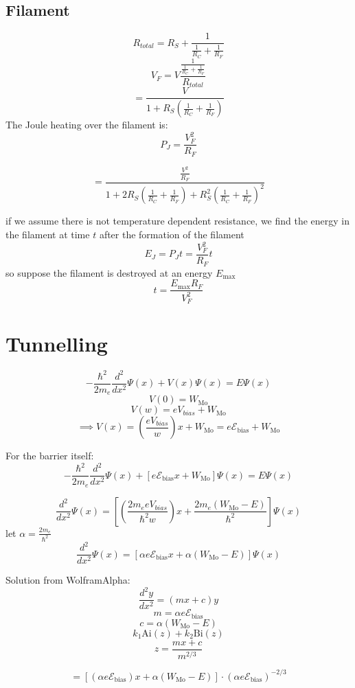 \documentclass{article}
\begin{document}
\subsection{Filament}
\[R_{total}=R_S+\frac{1}{\frac{1}{R_C}+\frac{1}{R_F}}\]
\[V_F=V\frac{\frac{1}{\frac{1}{R_C}+\frac{1}{R_F}}
}{
R_{total}
}\]
\[=\frac{V}{1+R_S\left(\frac{1}{R_C}+\frac{1}{R_F}\right)}\]
The Joule heating over the filament is:
\[P_J=\frac{V_F^2}{R_F}\]

\[=\frac{\frac{V^2}{R_F}}{1+2R_S\left(\frac{1}{R_C}+\frac{1}{R_F}\right)+R_S^2\left(\frac{1}{R_C}+\frac{1}{R_F}\right)^2}\]




if we assume there is not temperature dependent resistance, we find the energy in the filament at time $t$ after the formation of the filament
\[E_J=P_Jt=\frac{V_F^2}{R_F}t\]
so
suppose the filament is destroyed at an energy $E_{\max}$
\[t=\frac{E_{\max}R_F}{V_F^2}\]

\section{Tunnelling}

\[-\frac{\hbar^2}{2m_e} \frac{{d^2}}{{dx^2}}\Psi(x) + V(x)\Psi(x) = E\Psi(x)\]
\[V(0)=W_{\text{Mo}}\]
\[V(w)=eV_{bias}+W_{\text{Mo}}\]
\[\implies V(x)=\left(\frac{eV_{bias}}{w}\right)x+W_{\text{Mo}}=e\mathcal{E}_{\text{bias}}+W_{\text{Mo}}\]

For the barrier itself:
\[-\frac{\hbar^2}{2m_e} \frac{{d^2}}{{dx^2}}\Psi(x) + \left[e\mathcal{E}_{\text{bias}}x+W_{\text{Mo}}\right]\Psi(x) = E\Psi(x)\]

\[\frac{{d^2}}{{dx^2}}\Psi(x) = \left[\left(\frac{2m_eeV_{bias}}{\hbar^2w}\right)x+\frac{2m_e(W_{\text{Mo}}-E)}{\hbar^2}\right]\Psi(x)\]
let $\alpha=\frac{2m_e}{\hbar^2}$
\[\frac{{d^2}}{{dx^2}}\Psi(x) = \left[\alpha e\mathcal{E}_{\text{bias}}x+\alpha(W_{\text{Mo}}-E)\right]\Psi(x)\]

Solution from WolframAlpha:
\[\frac{{d^2y}}{{dx^2}}=(mx+c)y\]
\[m=\alpha e\mathcal{E}_{\text{bias}}\]
\[c=\alpha(W_{\text{Mo}}-E)\]
\[k_1\text{Ai}(z)+k_2\text{Bi}(z)\]
\[z=\frac{mx+c}{m^{2/3}}\]

\[=\left[\left(\alpha e\mathcal{E}_{\text{bias}}\right)x+\alpha(W_{\text{Mo}}-E)\right]
\cdot\left(\alpha e\mathcal{E}_{\text{bias}}\right)^{-2/3}\]
\end{document}
